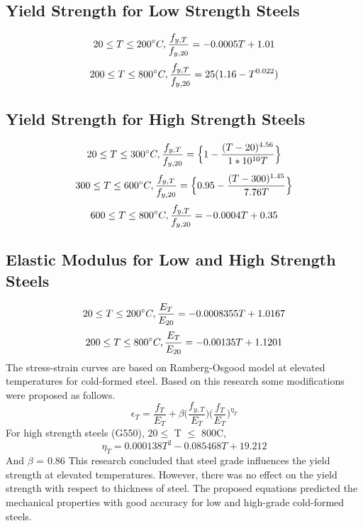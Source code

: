  \subsection*{Yield Strength for Low Strength Steels }
\begin{equation}
20 \leq T \leq 200\degree C , \dfrac{f_{y,T}}{f_{y,20}} = -0.0005T+1.01
\end{equation}
\begin{equation}
200 \leq T \leq 800\degree C , \dfrac{f_{y,T}}{f_{y,20}} = 25(1.16-T^{0.022})
\end{equation}
\subsection*{Yield Strength for High Strength Steels }
\begin{equation}
20 \leq T \leq 300\degree C , \dfrac{f_{y,T}}{f_{y,20}} = \Big\{ 1-\dfrac{(T-20)^{4.56}}{1*10^{10}T} \Big\}
\end{equation}
\begin{equation}
300 \leq T \leq 600\degree C , \dfrac{f_{y,T}}{f_{y,20}} = \Big\{ 0.95-\dfrac{(T-300)^{1.45}}{7.76T} \Big\}
\end{equation}
\begin{equation}
600 \leq T \leq 800\degree C , \dfrac{f_{y,T}}{f_{y,20}} = -0.0004T + 0.35
\end{equation}
\subsection*{Elastic Modulus for Low and High Strength Steels}
\begin{equation}
20 \leq T \leq 200\degree C , \dfrac{E_T}{E_{20}} = -0.0008355T+1.0167
\end{equation}
\begin{equation}
200 \leq T \leq 800\degree C , \dfrac{E_T}{E_{20}} = -0.00135T+1.1201
\end{equation}
The stress-strain curves are based on Ramberg-Osgood model at elevated temperatures for cold-formed steel.  Based on this research some modifications were proposed as follows. 
\begin{equation}
\epsilon_T = \dfrac{f_T}{E_T} + \beta \Big(\dfrac{f_{y,T}}{E_T}\Big)\Big(\dfrac{f_T}{E_T}\Big)^{\eta_{T}}
\end{equation}
For high strength steels (G550), 20$ \leq$ T $\leq$ 800\degree C,
\begin{equation}
\eta_T = 0.000138T^2 - 0.085468T + 19.212
\end{equation}
And
$\beta$ = 0.86
This research concluded that steel grade influences the yield strength at elevated temperatures. However, there was no effect on the yield strength with respect to thickness of steel. The proposed equations predicted the mechanical properties with good accuracy for low and high-grade cold-formed steels.
